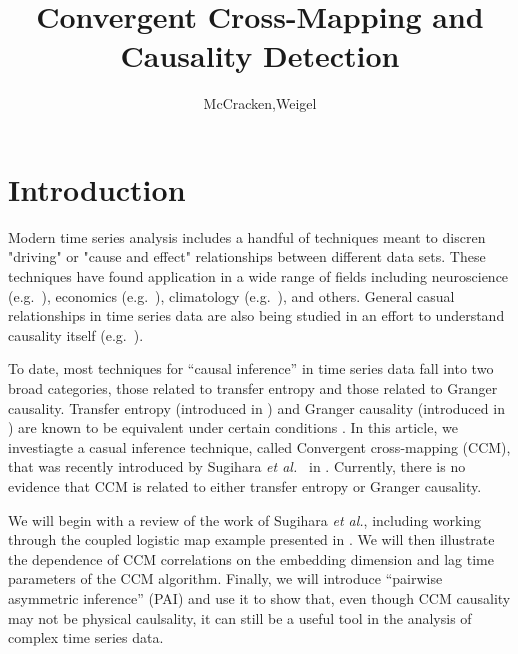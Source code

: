 \documentclass[a4paper,11pt]{article}
\title{Convergent Cross-Mapping and Causality Detection}
\author{McCracken,Weigel}
\begin{document}
\maketitle


\section{Introduction}
Modern time series analysis includes a handful of techniques meant to discren "driving" or "cause and effect" relationships between different data sets.  These techniques have found application in a wide range of fields including neuroscience (e.g.\ \cite{Kaminski2001}), economics (e.g.\ \cite{dufour1998,dufour2006}), climatology (e.g.\ \cite{mosedale2006}), and others.  General casual relationships in time series data are also being studied in an effort to understand causality itself (e.g.\ \cite{eichler2012}).  

To date, most techniques for ``causal inference'' in time series data fall into two broad categories, those related to transfer entropy and those related to Granger causality.  Transfer entropy (introduced in \cite{Schreiber2000}) and Granger causality (introduced in \cite{granger1969}) are known to be equivalent under certain conditions \cite{Barnett2009}.  In this article, we investiagte a casual inference technique, called Convergent cross-mapping (CCM), that was recently introduced by Sugihara {\em et al.\ } in \cite{Sugihara2012}.  Currently, there is no evidence that CCM is related to either transfer entropy or Granger causality.

We will begin with a review of the work of Sugihara {\em et al.}, including working through the coupled logistic map example presented in \cite{Sugihara2012}.  We will then illustrate the dependence of CCM correlations on the embedding dimension and lag time parameters of the CCM algorithm.  Finally, we will introduce ``pairwise asymmetric inference'' (PAI) and use it to show that, even though CCM causality may not be physical caulsality, it can still be a useful tool in the analysis of complex time series data.
\end{document}
